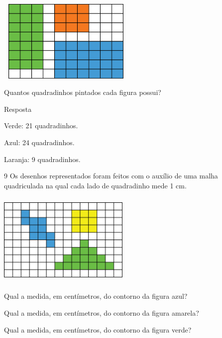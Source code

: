 \begin{escolha}

\includegraphics[width=2.59189in,height=1.55847in]{media/image56.png}

Quantos quadradinhos pintados cada figura possui?


Resposta

Verde: 21 quadradinhos.

Azul: 24 quadradinhos.

Laranja: 9 quadradinhos.

\num{9} Os desenhos representados foram feitos com o auxílio de uma malha
quadriculada na qual cada lado de quadradinho mede 1 cm.


\includegraphics[width=2.47521in,height=1.77515in]{media/image57.png}

\begin{escolha}

\item
  Qual a medida, em centímetros, do contorno da figura azul?
\coment{18 cm}

\item
  Qual a medida, em centímetros, do contorno da figura amarela?
\coment{12 cm}

\item
  Qual a medida, em centímetros, do contorno da figura verde?
\coment{22 cm}

\end{escolha}


\end{escolha}
